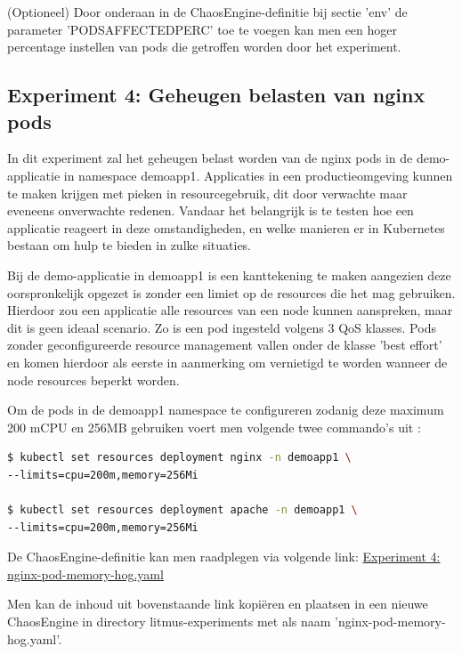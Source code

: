 (Optioneel) Door onderaan in de ChaosEngine-definitie bij sectie 'env' de parameter 'PODS\textunderscore AFFECTED\textunderscore PERC' toe te voegen kan men een hoger percentage instellen van pods die getroffen worden door het experiment.

\subsection{Experiment 4: Geheugen belasten van nginx pods}

In dit experiment zal het geheugen belast worden van de nginx pods in de demo-applicatie in namespace demoapp1. Applicaties in een productieomgeving kunnen te maken krijgen met pieken in resourcegebruik, dit door verwachte maar eveneens onverwachte redenen. Vandaar het belangrijk is te testen hoe een applicatie reageert in deze omstandigheden, en welke manieren er in Kubernetes bestaan om hulp te bieden in zulke situaties. 

Bij de demo-applicatie in demoapp1 is een kanttekening te maken aangezien deze oorspronkelijk opgezet is zonder een limiet op de resources die het mag gebruiken. Hierdoor zou een applicatie alle resources van een node kunnen aanspreken, maar dit is geen ideaal scenario. Zo is een pod ingesteld volgens 3 QoS klasses. Pods zonder geconfigureerde resource management vallen onder de klasse 'best effort' en komen hierdoor als eerste in aanmerking om vernietigd te worden wanneer de node resources beperkt worden. \autocite{Tatiyana2020}

Om de pods in de demoapp1 namespace te configureren zodanig deze maximum 200 mCPU en 256MB gebruiken voert men volgende twee commando's uit \autocite{Kubernetes2022c}: 
\begin{lstlisting}[language=bash]
$ kubectl set resources deployment nginx -n demoapp1 \
--limits=cpu=200m,memory=256Mi

$ kubectl set resources deployment apache -n demoapp1 \
--limits=cpu=200m,memory=256Mi

\end{lstlisting}

De ChaosEngine-definitie kan men raadplegen via volgende link: \href{https://github.com/KenBruggeman/BP\textunderscore 21-22/blob/master/bachelorproef/docs/litmus%20experimenten/nginx-pod-memory-hog.yaml}{Experiment 4: nginx-pod-memory-hog.yaml}

Men kan de inhoud uit bovenstaande link kopiëren en plaatsen in een nieuwe ChaosEngine in directory litmus-experiments met als naam 'nginx-pod-memory-hog.yaml'.


